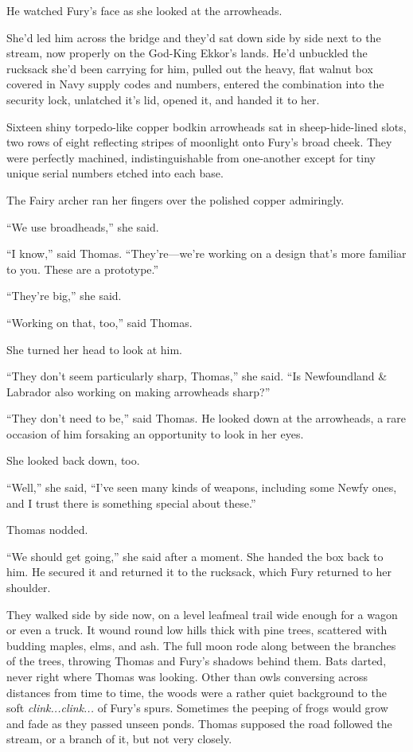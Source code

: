 \documentclass[11pt,a5paper]{article}
\begin{document}
He watched Fury's face as she looked at the arrowheads.

She'd led him across the bridge and they'd sat down side by side next to the stream, now properly on the God-King Ekkor's lands. He'd unbuckled the rucksack she'd been carrying for him, pulled out the heavy, flat walnut box covered in Navy supply codes and numbers, entered the combination into the security lock, unlatched it's lid, opened it, and handed it to her.

Sixteen shiny torpedo-like copper bodkin arrowheads sat in sheep-hide-lined slots, two rows of eight reflecting stripes of moonlight onto Fury's broad cheek. They were perfectly machined, indistinguishable from one-another except for tiny unique serial numbers etched into each base.

The Fairy archer ran her fingers over the polished copper admiringly.

``We use broadheads,'' she said.

``I know,'' said Thomas. ``They're---we're working on a design that's more familiar to you. These are a prototype.''

``They're big,'' she said.

``Working on that, too,'' said Thomas.

She turned her head to look at him.

``They don't seem particularly sharp, Thomas,'' she said. ``Is Newfoundland \& Labrador also working on making arrowheads sharp?''

``They don't need to be,'' said Thomas. He looked down at the arrowheads, a rare occasion of him forsaking an opportunity to look in her eyes.

She looked back down, too.

``Well,'' she said, ``I've seen many kinds of weapons, including some Newfy ones, and I trust there is something special about these.''

Thomas nodded.

``We should get going,'' she said after a moment. She handed the box back to him. He secured it and returned it to the rucksack, which Fury returned to her shoulder.

\vspace{1em}

They walked side by side now, on a level leafmeal trail wide enough for a wagon or even a truck. It wound round low hills thick with pine trees, scattered with budding maples, elms, and ash. The full moon rode along between the branches of the trees, throwing Thomas and Fury's shadows behind them. Bats darted, never right where Thomas was looking. Other than owls conversing across distances from time to time, the woods were a rather quiet background to the soft \emph{clink...clink...} of Fury's spurs. Sometimes the peeping of frogs would grow and fade as they passed unseen ponds. Thomas supposed the road followed the stream, or a branch of it, but not very closely.
\end{document}
